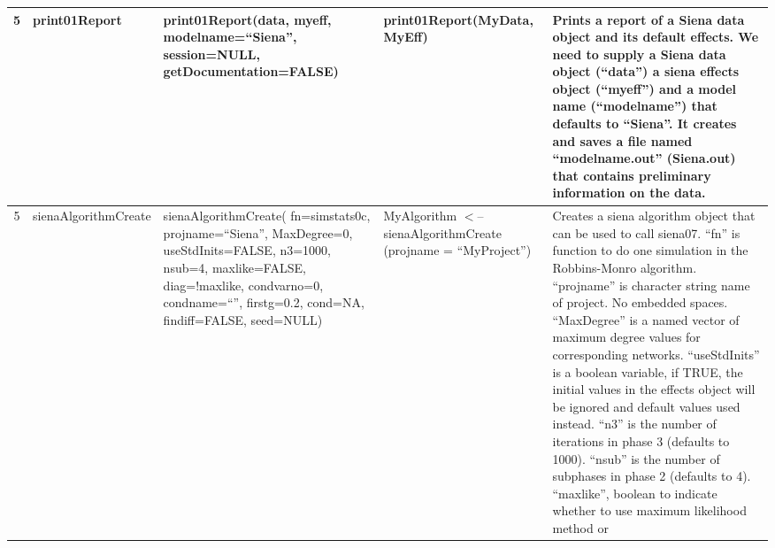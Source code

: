 \documentclass[a4paper,fleqn,11pt]{article}
\newcommand{\+}{\, + \,}
\begin{document}
{\begin{landscape}
\begin{small}
\begin{longtable}{c | p{2.4cm} | p{4.5cm} | p{4.0cm} | p{9.0cm} }
5 & print01Report & print01Report(data, myeff, \newline
modelname=``Siena'',\newline
session=NULL, \newline
getDocumentation=FALSE) & print01Report(MyData, MyEff) & Prints a
report of a Siena data object and its default effects. We need to supply a
Siena data object (``data'') a siena effects object (``myeff'') and a model
name (``modelname'') that defaults to ``Siena''. It creates and saves a file
named ``modelname.out'' (Siena.out) that contains preliminary information
on the data.\\
\hline

5 & sienaAlgorithmCreate & sienaAlgorithmCreate(\newline
fn=simstats0c,\newline
projname=``Siena'', \newline
MaxDegree=0, \newline
useStdInits=FALSE, n3=1000, \newline
nsub=4, maxlike=FALSE, \newline
diag=!maxlike, \newline
condvarno=0, \newline
condname=``'', firstg=0.2, \newline
cond=NA, findiff=FALSE, \newline
seed=NULL) &
\newline
MyAlgorithm $<$-- sienaAlgorithmCreate \newline
(projname = \newline
``MyProject'') & Creates a siena algorithm
object that can be used to call siena07. ``fn'' is function to do one
simulation in the Robbins-Monro algorithm.
``projname'' is character string name of
project. No embedded spaces. ``MaxDegree'' is a named vector of maximum degree
values for corresponding networks. ``useStdInits'' is a boolean variable, if
TRUE, the initial values in the effects object will be ignored and default
values used instead. ``n3'' is the number of iterations in phase 3 (defaults to
1000). ``nsub'' is the number of subphases in phase 2 (defaults to 4).
``maxlike'', boolean to indicate whether to use maximum likelihood method or

\end{longtable}
\end{small}
\end{landscape}}
\end{document}
